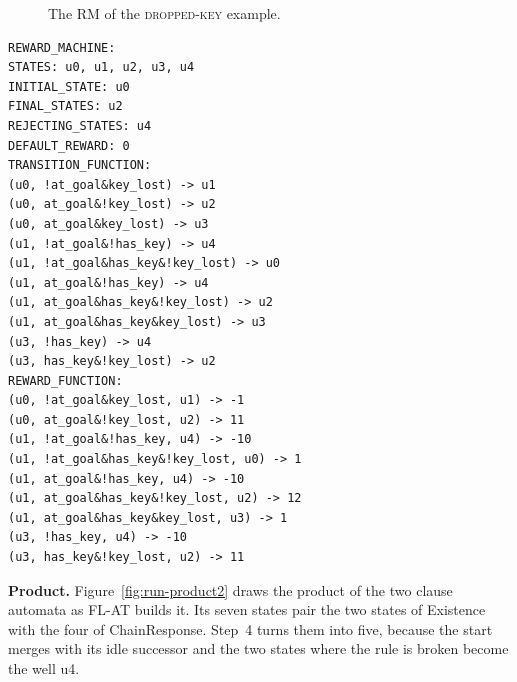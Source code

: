 \documentclass[11pt,english,listoffigures,listoftables]{tfgetsinf}
\newcommand{\runex}[1]{\textsc{#1}}  %
\begin{document}
\begin{figure}[H]
\centering
{}
\caption[RM of the \runex{dropped key}]{The RM of the \runex{dropped-key} example.}
\label{fig:ex2-rm}
\end{figure}

\noindent\begin{minipage}{\linewidth}
\begin{lstlisting}[style=rm,caption={The RM of the \runex{dropped-key} example.},label={lst:ex2-rm}]
REWARD_MACHINE:
STATES: u0, u1, u2, u3, u4
INITIAL_STATE: u0
FINAL_STATES: u2
REJECTING_STATES: u4
DEFAULT_REWARD: 0
TRANSITION_FUNCTION:
(u0, !at_goal&key_lost) -> u1
(u0, at_goal&!key_lost) -> u2
(u0, at_goal&key_lost) -> u3
(u1, !at_goal&!has_key) -> u4
(u1, !at_goal&has_key&!key_lost) -> u0
(u1, at_goal&!has_key) -> u4
(u1, at_goal&has_key&!key_lost) -> u2
(u1, at_goal&has_key&key_lost) -> u3
(u3, !has_key) -> u4
(u3, has_key&!key_lost) -> u2
REWARD_FUNCTION:
(u0, !at_goal&key_lost, u1) -> -1
(u0, at_goal&!key_lost, u2) -> 11
(u1, !at_goal&!has_key, u4) -> -10
(u1, !at_goal&has_key&!key_lost, u0) -> 1
(u1, at_goal&!has_key, u4) -> -10
(u1, at_goal&has_key&!key_lost, u2) -> 12
(u1, at_goal&has_key&key_lost, u3) -> 1
(u3, !has_key, u4) -> -10
(u3, has_key&!key_lost, u2) -> 11
\end{lstlisting}
\end{minipage}

\textbf{Product.} Figure~\ref{fig:run-product2} draws the product of the two clause automata as FL-AT builds it. Its seven states pair the two states of Existence with the four of ChainResponse. Step~4 turns them into five, because the start merges with its idle successor and the two states where the rule is broken become the well u4.
\end{document}
